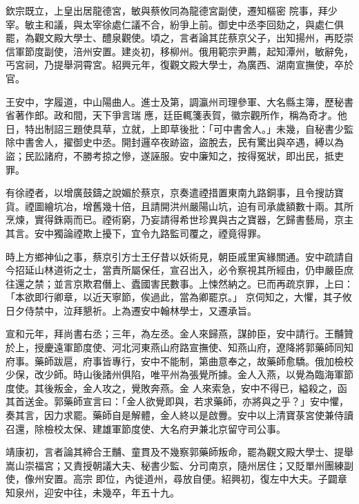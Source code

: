 \begin{pinyinscope}
 欽宗既立，上皇出居龍德宮，敏與蔡攸同為龍德宮副使，遷知樞密
 院事，拜少宰。敏主和議，與太宰徐處仁議不合，紛爭上前。御史中丞李回劾之，與處仁俱罷，為觀文殿大學士、醴泉觀使。頃之，言者論其芘蔡京父子，出知揚州，再貶崇信軍節度副使，涪州安置。建炎初，移柳州。俄用範宗尹薦，起知潭州，敏辭免，丐宮祠，乃提舉洞霄宮。紹興元年，復觀文殿大學士，為廣西、湖南宣撫使，卒於官。



 王安中，字履道，中山陽曲人。進士及第，調瀛州司理參軍、大名縣主簿，歷秘書省著作郎。政和間，天下爭言瑞
 應，廷臣輒箋表賀，徽宗觀所作，稱為奇才。他日，特出制詔三題使具草，立就，上即草後批：「可中書舍人。」未幾，自秘書少監除中書舍人，擢御史中丞。開封邏卒夜跡盜，盜脫去，民有驚出與卒遇，縛以為盜；民訟諸府，不勝考掠之慘，遂誣服。安中廉知之，按得冤狀，即出民，抵吏罪。



 有徐禋者，以增廣鼓鑄之說媚於蔡京，京奏遣禋措置東南九路銅事，且令搜訪寶貨。禋圖繪坑冶，增舊幾十倍，且請開洪州嚴陽山坑，迫有司承歲額數十兩。其所
 烹煉，實得銖兩而已。禋術窮，乃妄請得希世珍異與古之寶器，乞歸書藝局，京主其言。安中獨論禋欺上擾下，宜令九路監司覆之，禋竟得罪。



 時上方鄉神仙之事，蔡京引方士王仔昔以妖術見，朝臣戚里寅緣關通。安中疏請自今招延山林道術之士，當責所屬保任，宣召出入，必令察視其所經由，仍申嚴臣庶往還之禁；並言京欺君僭上、蠹國害民數事。上悚然納之。已而再疏京罪，上曰：「本欲即行卿章，以近天寧節，俟過此，當為卿罷京。」
 京伺知之，大懼，其子攸日夕侍禁中，泣拜懇祈。上為遷安中翰林學士，又遷承旨。



 宣和元年，拜尚書右丞；三年，為左丞。金人來歸燕，謀帥臣，安中請行。王黼贊於上，授慶遠軍節度使、河北河東燕山府路宣撫使、知燕山府，遼降將郭藥師同知府事。藥師跋扈，府事皆專行，安中不能制，第曲意奉之，故藥師愈驕。俄加檢校少保，改少師。時山後諸州俱陷，唯平州為張覺所據。金人入燕，以覺為臨海軍節度使。其後叛金，金人攻之，覺敗奔燕。金
 人來索急，安中不得已，縊殺之，函其首送金。郭藥師宣言曰：「金人欲覺即與，若求藥師，亦將與之乎？」安中懼，奏其言，因力求罷。藥師自是解體，金人終以是啟釁。安中以上清寶菉宮使兼侍讀召還，除檢校太保、建雄軍節度使、大名府尹兼北京留守司公事。



 靖康初，言者論其締合王黼、童貫及不幾察郭藥師叛命，罷為觀文殿大學士、提舉嵩山崇福宮；又責授朝議大夫、秘書少監、分司南京，隨州居住；又貶單州團練副使，像州安置。高宗
 即位，內徙道州，尋放自便。紹興初，復左中大夫。子闢章知泉州，迎安中往，未幾卒，年五十九。




\end{pinyinscope}
